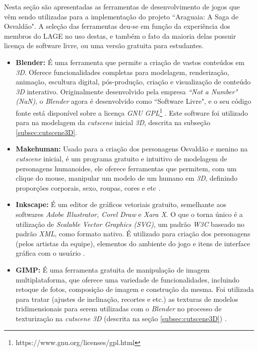 Nesta seção são apresentadas as ferramentas de desenvolvimento de jogos que vêm sendo utilizadas para a implementação do projeto ``Araguaia: A Saga de Osvaldão". A seleção das ferramentas deu-se em função da experiência dos membros do LAGE no uso destas, e também o fato da maioria delas possuir licença de software livre, ou uma versão gratuita para estudantes.

\newpage

\begin{itemize}
	\item \textbf{Blender:} É uma ferramenta que permite a criação de vastos conteúdos em \textit{3D}. Oferece funcionalidades completas para modelagem, renderização, animação, escultura digital, pós-produção, criação e visualização de conteúdo \textit{3D} interativo. Originalmente desenvolvido pela empresa \textit{``Not a Number"\space(NaN)}, o \textit{Blender} agora é desenvolvido como ``Software Livre", e o seu código fonte está disponível sobre a licença \textit{GNU GPL}\footnote{https://www.gnu.org/licenses/gpl.html} \cite{bib:blender2018}. Este software foi utilizado para na modelagem da \textit{cutscene} inicial \textit{3D}, descrita na subseção \ref{subsec:cutscene3D}.
	
	\item \textbf{Makehuman:} Usado para a criação dos personagens Osvaldão e menino na \textit{cutscene} inicial, é um programa gratuito e intuitivo de modelagem de personagens humanoides, ele oferece ferramentas que permitem, com um clique do mouse, manipular um modelo de um humano em \textit{3D}, definindo proporções corporais, sexo, roupas, cores e etc \cite{bib:makehuman2018}.
	
	\item \textbf{Inkscape:} É um editor de gráficos vetoriais gratuito, semelhante aos softwares \textit{Adobe Illustrator, Corel Draw} e \textit{Xara X}. O que o torna único é a utilização de \textit{Scalable Vector Graphics (SVG)}, um padrão \textit{W3C} baseado no padrão \textit{XML}, como formato nativo. É utilizado para criação dos personagens (pelos artistas da equipe), elementos do ambiente do jogo e itens de interface gráfica com o usuário \cite{bib:inkscape2016}.
	
	\item \textbf{GIMP:} É uma ferramenta gratuita de manipulação de imagem multiplataforma, que oferece uma variedade de funcionalidades, incluindo retoque de fotos, composição de imagem e construção da mesma. Foi utilizada para tratar (ajustes de inclinação, recortes e etc.) as texturas de modelos tridimensionais para serem utilizadas com o \textit{Blender} no processo de texturização na \textit{cutscene 3D} (descrita na seção \ref{subsec:cutscene3D}) \cite{bib:gimp2018}.
	

\end{itemize}
